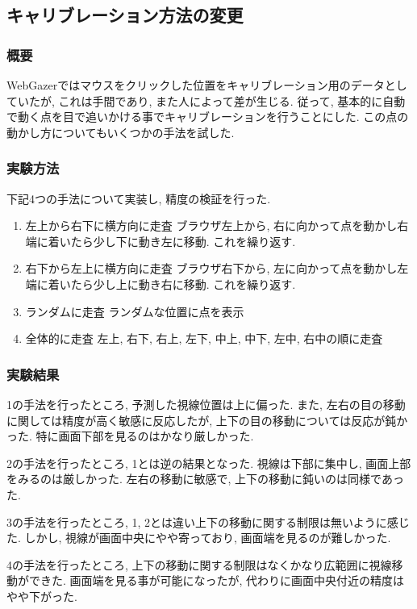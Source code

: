 \documentclass[a4paper,11pt]{jsarticle}
\begin{document}
\subsection{キャリブレーション方法の変更}
\subsubsection{概要}
WebGazerではマウスをクリックした位置をキャリブレーション用のデータとしていたが, これは手間であり, また人によって差が生じる.
従って, 基本的に自動で動く点を目で追いかける事でキャリブレーションを行うことにした. 
この点の動かし方についてもいくつかの手法を試した.

\subsubsection{実験方法}
下記4つの手法について実装し, 精度の検証を行った.
\begin{enumerate}
  \item{左上から右下に横方向に走査} ブラウザ左上から, 右に向かって点を動かし右端に着いたら少し下に動き左に移動. これを繰り返す.
  \item{右下から左上に横方向に走査} ブラウザ右下から, 左に向かって点を動かし左端に着いたら少し上に動き右に移動. これを繰り返す.
  \item{ランダムに走査} ランダムな位置に点を表示
  \item{全体的に走査} 左上, 右下, 右上, 左下, 中上, 中下, 左中, 右中の順に走査
\end{enumerate}

\subsubsection{実験結果}
1の手法を行ったところ,  予測した視線位置は上に偏った. 
また, 左右の目の移動に関しては精度が高く敏感に反応したが, 上下の目の移動については反応が鈍かった.
特に画面下部を見るのはかなり厳しかった.

2の手法を行ったところ, 1とは逆の結果となった. 視線は下部に集中し, 画面上部をみるのは厳しかった.
左右の移動に敏感で, 上下の移動に鈍いのは同様であった.

3の手法を行ったところ, 1, 2とは違い上下の移動に関する制限は無いように感じた.
しかし, 視線が画面中央にやや寄っており, 画面端を見るのが難しかった.

4の手法を行ったところ, 上下の移動に関する制限はなくかなり広範囲に視線移動ができた.
画面端を見る事が可能になったが, 代わりに画面中央付近の精度はやや下がった.
\end{document}
